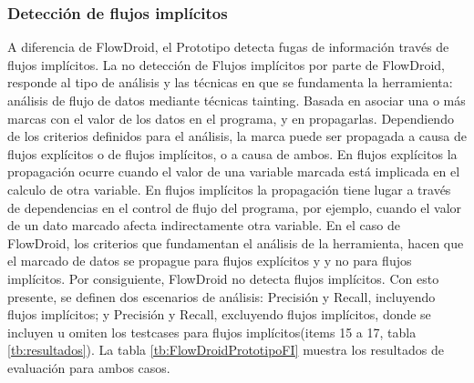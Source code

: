 \subsubsection{Detección de flujos implícitos}
A diferencia de FlowDroid, el Prototipo detecta fugas de información través de
flujos implícitos. La no detección de Flujos implícitos por parte de FlowDroid,
responde al tipo de análisis y las técnicas en que se fundamenta la herramienta:
análisis de flujo de datos mediante técnicas tainting. Basada en 
% 
% 
asociar una o más marcas
con el valor de los datos en el programa, y en propagarlas. Dependiendo de los
criterios definidos para el análisis, la marca puede ser propagada a causa de
flujos explícitos o de flujos implícitos, o a causa de ambos. En flujos
explícitos la propagación ocurre cuando el valor de una variable marcada está
implicada en el calculo de otra variable. En flujos implícitos la propagación
tiene lugar a través de dependencias en el control de flujo del programa, por
ejemplo, cuando el valor de un dato marcado afecta indirectamente otra variable.\newline 
En el caso de FlowDroid, los criterios que fundamentan el análisis de la
herramienta, hacen que el marcado de datos se propague para flujos explícitos y
y no para flujos implícitos. Por consiguiente, FlowDroid no detecta flujos
implícitos.\newline
Con esto presente, se definen dos escenarios de análisis: Precisión y Recall,
incluyendo flujos implícitos; y  Precisión y Recall, excluyendo flujos
implícitos, donde se incluyen u omiten los testcases para flujos
implícitos(items 15 a 17, tabla \ref{tb:resultados}).\newline
La tabla \ref{tb:FlowDroidPrototipoFI} muestra los resultados de evaluación para
ambos casos.\newline
